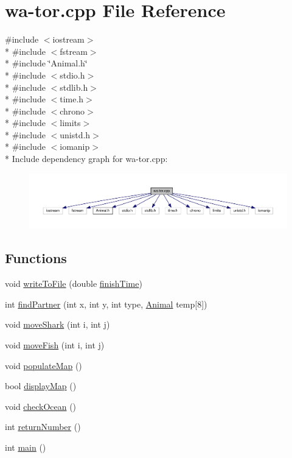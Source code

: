 \hypertarget{wa-tor_8cpp}{}\section{wa-\/tor.cpp File Reference}
\label{wa-tor_8cpp}
{\ttfamily \#include $<$iostream$>$}\\*
{\ttfamily \#include $<$fstream$>$}\\*
{\ttfamily \#include \char`\"{}Animal.\+h\char`\"{}}\\*
{\ttfamily \#include $<$stdio.\+h$>$}\\*
{\ttfamily \#include $<$stdlib.\+h$>$}\\*
{\ttfamily \#include $<$time.\+h$>$}\\*
{\ttfamily \#include $<$chrono$>$}\\*
{\ttfamily \#include $<$limits$>$}\\*
{\ttfamily \#include $<$unistd.\+h$>$}\\*
{\ttfamily \#include $<$iomanip$>$}\\*
Include dependency graph for wa-\/tor.cpp\+:
\nopagebreak
\begin{figure}[H]
\begin{center}
\leavevmode
\includegraphics[width=350pt]{wa-tor_8cpp__incl}
\end{center}
\end{figure}
\subsection*{Functions}
\begin{DoxyCompactItemize}
\item 
void \hyperlink{wa-tor_8cpp_a87c9b3649865243c358781b9ba5a63ef}{write\+To\+File} (double \hyperlink{wa-tor_8cpp_a7cc6537125267d34b92ee58c7d5fa264}{finish\+Time})
\item 
int \hyperlink{wa-tor_8cpp_ac9c4c92d69ed70ac460b756440fc78ac}{find\+Partner} (int x, int y, int type, \hyperlink{class_animal}{Animal} temp\mbox{[}8\mbox{]})
\item 
void \hyperlink{wa-tor_8cpp_aa170cf839bf56d3c8a4b1e3ccf6885b9}{move\+Shark} (int i, int j)
\item 
void \hyperlink{wa-tor_8cpp_a89d4d5007ecb60011e978769f110d321}{move\+Fish} (int i, int j)
\item 
void \hyperlink{wa-tor_8cpp_a97e8c1c739a32ed95b9a7d50a53c52f7}{populate\+Map} ()
\item 
bool \hyperlink{wa-tor_8cpp_a9b90639a814dc879557d7ca2b4a8f188}{display\+Map} ()
\item 
void \hyperlink{wa-tor_8cpp_a9608986b5ab97722f2ebb5dccf5c83d2}{check\+Ocean} ()
\item 
int \hyperlink{wa-tor_8cpp_a662b974739cd0c3ab43007ea6530f4a8}{return\+Number} ()
\item 
int \hyperlink{wa-tor_8cpp_ae66f6b31b5ad750f1fe042a706a4e3d4}{main} ()
\end{DoxyCompactItemize}
